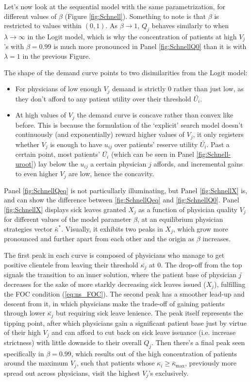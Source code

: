 \documentclass[../main.tex]{subfiles}
\begin{document}
Let's now look at the sequential model with the same parametrization, for different values of $\beta$ (Figure \ref{fig:Schnell}). Something to note is that $\beta$ is restricted to values within $(0,1)$. As $\beta \rightarrow 1$, $Q_j$ behaves similarly to when $\lambda \rightarrow \infty$ in the Logit model, which is why the concentration of patients at high $V_j$'s with $\beta = 0.99$ is much more pronounced in Panel \ref{fig:SchnellQ0} than it is with $\lambda = 1$ in the previous Figure.

The shape of the demand curve points to two disimilarities from the Logit model:
\begin{itemize}[itemsep=-1pt, topsep=0pt]
    \item For physicians of low enough $V_j$ demand is strictly 0 rather than just low, as they don't afford to any patient utility over their threshold $\bar{U_i}$.
    \item At high values of $V_j$ the demand curve is concave rather than convex like before. This is because the formulation of the `explicit' search model doesn't continuously (and exponentially) reward higher values of $V_j$, it only registers whether $V_j$ is enough to have $u_{ij}$ over patients' reserve utility $\bar{U_i}$. Past a certain point, most patients' $\bar{U_i}$ (which can be seen in Panel \ref{fig:Schnell-uroot}) lay below the $u_{ij}$ a certain physician $j$ affords, and incremental gains to even higher $V_j$ are low, hence the concavity.
\end{itemize}

Panel \ref{fig:SchnellQeq} is not particullarly illuminating, but Panel \ref{fig:SchnellX} is, and can show the difference between \ref{fig:SchnellQeq} and \ref{fig:SchnellQ0}. Panel \ref{fig:SchnellX} displays sick leaves granted $X_j$ as a function of physician quality $V_j$ for different values of the model parameter $\beta$, at an equilibrium physician strategies vector $\bar{\kappa}^*$. Visually, it exhibits two peaks in $X_j$, which grow more pronounced and further apart from each other and the origin as $\beta$ increases.

The first peak in each curve is composed of physicians who manage to get positive clientele from leaving their threshold $\bar{\kappa_j}$ at 0. The drop-off from the top signals the transition to an inner solution, where the patient base of physician $j$ decreases for the sake of more starkly decreasing sick leaves issued ($X_j$), fulfilling the FOC condition (\ref{eq:ns_FOC}). The second peak has a smoother lead-up and descent from it, in which physicians make the trade-off of gaining patients through lower $\bar{\kappa_j}$ but requiring sick leave lenience. The peak itself represents the tipping point, after which physicians gain a significant patient base just by virtue of their high $V_j$ and can afford to cut back on sick leave issuance (i.e. increase strictness) with little downside to their overall $Q_j$. Then there's a final peak seen specifically in $\beta = 0.99$, which results out of the high concentration of patients around the maximum $V_j$, such that patients whose $\kappa_i \geq \bar{\kappa}_{\max}$, previously more spread out across physicians, visit the highest $V_j$'s exclusively.
\end{document}
